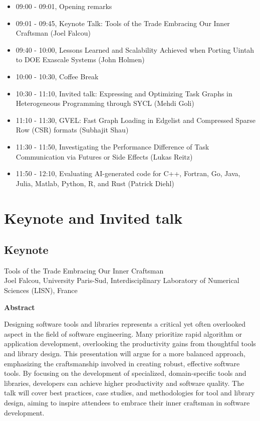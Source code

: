 \documentclass{article}
\begin{document}
\begin{itemize}
 \item 09:00 - 09:01, Opening remarks
 \item 09:01 - 09:45, Keynote Talk: Tools of the Trade Embracing Our Inner Craftsman (Joel Falcou)
 \item 09:40 - 10:00, Lessons Learned and Scalability Achieved when Porting Uintah to DOE Exascale Systems (John Holmen)
\item 10:00 - 10:30, Coffee Break
\item 10:30 - 11:10, Invited talk: Expressing and Optimizing Task Graphs in Heterogeneous Programming through SYCL (Mehdi Goli)
 \item   11:10 - 11:30, GVEL: Fast Graph Loading in Edgelist and Compressed Sparse Row (CSR) formats (Subhajit Shau)
 \item 11:30 - 11:50, Investigating the Performance Difference of Task Communication via Futures or Side Effects (Lukas Reitz)
 \item   11:50 - 12:10, Evaluating AI-generated code for C++, Fortran, Go, Java, Julia, Matlab, Python, R, and Rust (Patrick Diehl) 



\end{itemize}

\section{Keynote and Invited talk}

\subsection{Keynote}
Tools of the Trade Embracing Our Inner Craftsman\\
Joel Falcou, University Paris-Sud, Interdisciplinary Laboratory of Numerical Sciences (LISN), France
    \begin{center}
        \textbf{Abstract}
    \end{center}
Designing software tools and libraries represents a critical yet often overlooked aspect in the field of software engineering. Many prioritize rapid algorithm or application development, overlooking the productivity gains from thoughtful tools and library design. This presentation will argue for a more balanced approach, emphasizing the craftsmanship involved in creating robust, effective software tools. By focusing on the development of specialized, domain-specific tools and libraries, developers can achieve higher productivity and software quality. The talk will cover best practices, case studies, and methodologies for tool and library design, aiming to inspire attendees to embrace their inner craftsman in software development.
\end{document}
